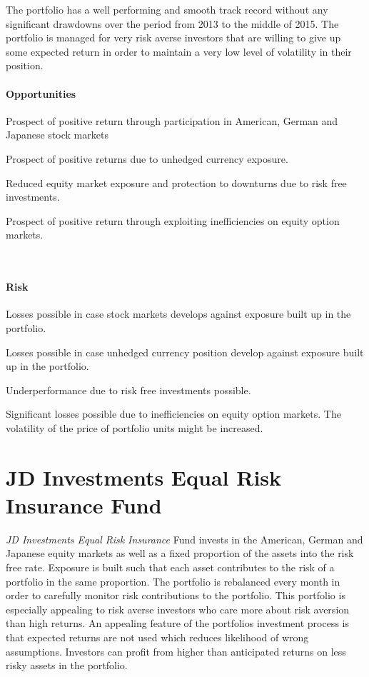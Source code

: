 \documentclass[11pt, DIV=15]{scrreprt}
\begin{document}
The portfolio has a well performing and smooth track record without any significant drawdowns over the period from 2013 to the middle of 2015.
The portfolio is managed for very risk averse investors that are willing to give up some expected return in order to maintain a very low level of volatility in their position.

\begin{minipage}[t]{0.49\textwidth}
  \paragraph{Opportunities}
  \begin{sit}
    \item Prospect of positive return through participation in American, German and Japanese stock markets
    \item Prospect of positive returns due to unhedged currency exposure.
    \item Reduced equity market exposure and protection to downturns due to risk free investments.
    \item Prospect of positive return through exploiting inefficiencies on equity option markets.
  \end{sit}
\end{minipage}
~~
\begin{minipage}[t]{0.49\textwidth}
  \paragraph{Risk}
  \begin{sit}
    \item Losses possible in case stock markets develops against exposure built up in the portfolio.
    \item Losses possible in case unhedged currency position develop against exposure built up in the portfolio.
    \item Underperformance due to risk free investments possible.
    \item Significant losses possible due to inefficiencies on equity option markets. The volatility of the price of portfolio units might be increased.
  \end{sit}
\end{minipage}

\newpage\section*{JD Investments Equal Risk Insurance Fund}
\textit{JD Investments Equal Risk Insurance} Fund invests in the American, German and Japanese equity markets as well as a fixed proportion of the assets into the risk free rate.
Exposure is built such that each asset contributes to the risk of a portfolio in the same proportion.
The portfolio is rebalanced every month in order to carefully monitor risk contributions to the portfolio.
This portfolio is especially appealing to risk averse investors who care more about risk aversion than high returns.
An appealing feature of the portfolios investment process is that expected returns are not used which reduces likelihood of wrong assumptions.
Investors can profit from higher than anticipated returns on less risky assets in the portfolio.
 
\end{document}
